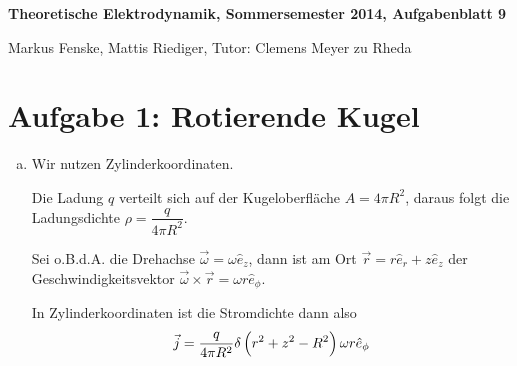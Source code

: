 \documentclass[a4paper,german,12pt,smallheadings]{scrartcl}
\begin{document}
\allowdisplaybreaks %
\begin{center}
\bfseries %
\sffamily %
\vspace{-40pt}
Theoretische Elektrodynamik, Sommersemester 2014, Aufgabenblatt 9

Markus Fenske, Mattis Riediger, Tutor: Clemens Meyer zu Rheda
\vspace{-10pt}
\end{center}

\section*{Aufgabe 1: Rotierende Kugel}
\begin{enumerate}[a)]
\item
Wir nutzen Zylinderkoordinaten.

Die Ladung $q$ verteilt sich auf der Kugeloberfläche $A = 4 \pi R^2$, daraus
folgt die Ladungsdichte $\rho = \dfrac{q}{4 \pi R^2}$.

Sei o.B.d.A. die Drehachse $\vec{\omega} = \omega \hat{e}_z$, dann ist am Ort
$\vec{r} = r\hat{e}_r + z \hat{e}_z$ der Geschwindigkeitsvektor $\vec{\omega}
\times \vec{r} = \omega r \hat{e}_\phi$.

In Zylinderkoordinaten ist die Stromdichte dann also
\begin{equation}
  \vec{j} =  \frac{q}{4 \pi R^2} \delta\del{r^2 + z^2 - R^2} \omega r \hat{e}_\phi
\end{equation}
\end{enumerate}
\end{document}
